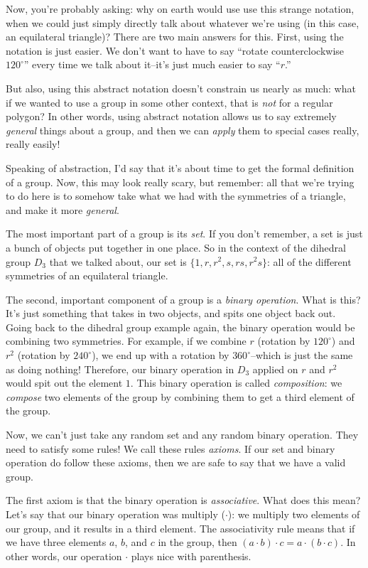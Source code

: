 \documentclass{article}
\begin{document}
Now, you're probably asking: why on earth would use use this strange notation, when we could just simply directly talk about whatever we're using (in this case, an equilateral triangle)? There are two main answers for this. First, using the notation is just easier. We don't want to have to say ``rotate counterclockwise $120^\circ$'' every time we talk about it--it's just much easier to say ``$r$.''

But also, using this abstract notation doesn't constrain us nearly as much: what if we wanted to use a group in some other context, that is \emph{not} for a regular polygon? In other words, using abstract notation allows us to say extremely \emph{general} things about a group, and then we can \emph{apply} them to special cases really, really easily!

Speaking of abstraction, I'd say that it's about time to get the formal definition of a group. Now, this may look really scary, but remember: all that we're trying to do here is to somehow take what we had with the symmetries of a triangle, and make it more \emph{general}.

The most important part of a group is its \emph{set}. If you don't remember, a set is just a bunch of objects put together in one place. So in the context of the dihedral group $D_3$ that we talked about, our set is $\{1, r, r^2, s, rs, r^2s\}$: all of the different symmetries of an equilateral triangle.

The second, important component of a group is a \emph{binary operation}. What is this? It's just something that takes in two objects, and spits one object back out. Going back to the dihedral group example again, the binary operation would be combining two symmetries. For example, if we combine $r$ (rotation by $120^\circ$) and $r^2$ (rotation by $240^\circ$), we end up with a rotation by $360^\circ$--which is just the same as doing nothing! Therefore, our binary operation in $D_3$ applied on $r$ and $r^2$ would spit out the element $1$. This binary operation is called \emph{composition}: we \emph{compose} two elements of the group by combining them to get a third element of the group.

Now, we can't just take any random set and any random binary operation. They need to satisfy some rules! We call these rules \emph{axioms}. If our set and binary operation do follow these axioms, then we are safe to say that we have a valid group.

The first axiom is that the binary operation is \emph{associative}. What does this mean? Let's say that our binary operation was multiply ($\cdot$): we multiply two elements of our group, and it results in a third element. The associativity rule means that if we have three elements $a$, $b$, and $c$ in the group, then $(a\cdot b)\cdot c=a\cdot (b\cdot c)$. In other words, our operation $\cdot$ plays nice with parenthesis.
\end{document}
